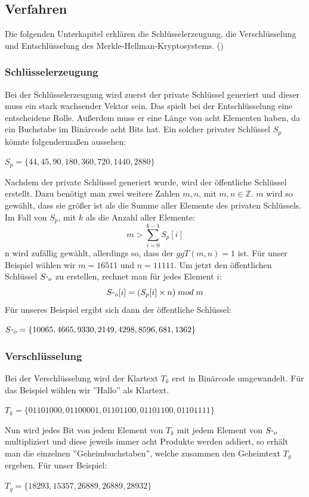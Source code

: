 \documentclass[a4paper,12pt,titlepage]{article}
\begin{document}
\subsection{Verfahren}
Die folgenden Unterkapitel erklären die Schlüsselerzeugung, die Verschlüsselung und Entschlüsselung des Merkle-Hellman-Kryptosystems. (\cite{merklehellman_neer})
\subsubsection{Schlüsselerzeugung}
Bei der Schlüsselerzeugung wird zuerst der private Schlüssel generiert und dieser muss ein stark wachsender Vektor sein. Das spielt bei der Entschlüsselung eine entscheidene Rolle. Außerdem muss er eine Länge von acht Elementen haben, da ein Buchstabe im Binärcode acht Bits hat. Ein solcher privater Schlüssel $S_p$ könnte folgendermaßen aussehen:
\begin{center}
$S_p=\{44,45,90,180,360,720,1440,2880\}$
\end{center}
Nachdem der private Schlüssel generiert wurde, wird der öffentliche Schlüssel erstellt. Dazu benötigt man zwei weitere Zahlen $m,n$, mit $m,n \in \mathbb{Z}$. $m$ wird so gewählt, dass sie größer ist als die Summe aller Elemente des privaten Schlüssels. Im Fall von $S_p$, mit $k$ als die Anzahl aller Elemente:
\begin{equation*}
m > \sum_{i=0}^{k-1} S_p[i]
\end{equation*}
n wird zufällig gewählt, allerdings so, dass der $ggT(m, n) = 1$ ist.
Für unser Beispiel wählen wir $m = 16511$ und $n = 11111$. Um jetzt den öffentlichen Schlüssel $S_{"o}$ zu erstellen, rechnet man für jedes Element $i$:
\begin{equation*}
S_{"o}[i]=(S_p[i] \times n)\; mod \; m
\end{equation*}
Für unseres Beispiel ergibt sich dann der öffentliche Schlüssel:
\begin{center}
$S_{"o}=\{10065,4665,9330,2149,4298,8596,681,1362\}$
\end{center}

\subsubsection{Verschlüsselung}
Bei der Verschlüsselung wird der Klartext $T_k$ erst in Binärcode umgewandelt. Für das Beispiel wählen wir ''Hallo'' als Klartext.
\begin{center}
$T_k = \{01101000, 01100001, 01101100, 01101100, 01101111\}$
\end{center}
Nun wird jedes Bit von jedem Element von $T_k$ mit jedem Element von $S_{"o}$ multipliziert und diese jeweils immer acht Produkte werden addiert, so erhält man die einzelnen ''Geheimbuchstaben'', welche zusammen den Geheimtext $T_g$ ergeben.
Für unser Beispiel:
\begin{center}
$T_g=\{18293,15357,26889,26889,28932\}$
\end{center}
\end{document}
